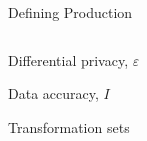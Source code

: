 \begin{frame}{Defining Production}
\begin{columns}[T] %
\begin{column}{.58\textwidth}
  \begin{wideitemize}
    \item Differential privacy, $\varepsilon$
    \item Data accuracy, $I$
    \item Transformation sets
  \end{wideitemize}
\end{column}%
\hfill%
\begin{column}{.38\textwidth}
\end{column}%
\end{columns}
\end{frame}

